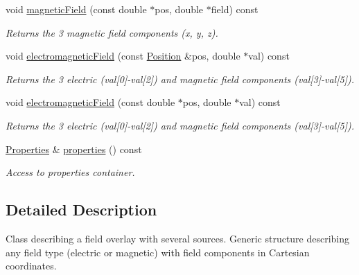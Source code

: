 \begin{DoxyCompactItemize}
void \hyperlink{class_d_d4hep_1_1_geometry_1_1_overlayed_field_ae02970e5b4ec1575adcfdb05345e7316}{magneticField} (const double $\ast$pos, double $\ast$field) const 
\begin{DoxyCompactList}\small\item\em Returns the 3 magnetic field components (x, y, z). \item\end{DoxyCompactList}\item 
void \hyperlink{class_d_d4hep_1_1_geometry_1_1_overlayed_field_ae3937e0cc788e234ee2b96182eeeeb60}{electromagneticField} (const \hyperlink{namespace_d_d4hep_1_1_geometry_a55083902099d03506c6db01b80404900}{Position} \&pos, double $\ast$val) const 
\begin{DoxyCompactList}\small\item\em Returns the 3 electric (val\mbox{[}0\mbox{]}-\/val\mbox{[}2\mbox{]}) and magnetic field components (val\mbox{[}3\mbox{]}-\/val\mbox{[}5\mbox{]}). \item\end{DoxyCompactList}\item 
void \hyperlink{class_d_d4hep_1_1_geometry_1_1_overlayed_field_a4be1f82d78ddb39722af11c407be7266}{electromagneticField} (const double $\ast$pos, double $\ast$val) const 
\begin{DoxyCompactList}\small\item\em Returns the 3 electric (val\mbox{[}0\mbox{]}-\/val\mbox{[}2\mbox{]}) and magnetic field components (val\mbox{[}3\mbox{]}-\/val\mbox{[}5\mbox{]}). \item\end{DoxyCompactList}\item 
\hyperlink{class_d_d4hep_1_1_geometry_1_1_overlayed_field_acdf81fbf8e0c336cb724ee2846a2c5b0}{Properties} \& \hyperlink{class_d_d4hep_1_1_geometry_1_1_overlayed_field_ab62f0df6c7eeb974faa87e327f8bcdfb}{properties} () const 
\begin{DoxyCompactList}\small\item\em Access to properties container. \item\end{DoxyCompactList}\end{DoxyCompactItemize}


\subsection{Detailed Description}
Class describing a field overlay with several sources. Generic structure describing any field type (electric or magnetic) with field components in Cartesian coordinates.

